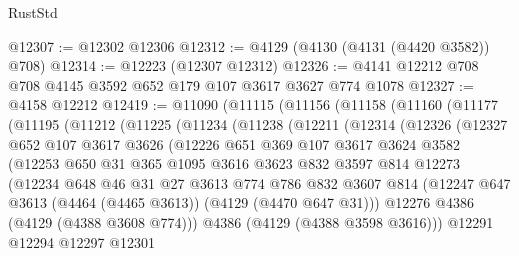 \begin{lexlean}{RustStd}
\begin{coremodule}
{\begin{coremodule}
{{{{{{{{{{{{{{@12307 := @12302 @12306
@12312 := @4129 (@4130 (@4131 (@4420 @3582)) @708)
@12314 := @12223 (@12307 @12312)
@12326 := @4141 @12212 @708 @708 @4145 @3592 @652 @179 @107 @3617 @3627 @774 @1078
@12327 := @4158 @12212
@12419 := @11090
    (@11115
      (@11156
        (@11158
          (@11160
            (@11177
              (@11195
                (@11212
                  (@11225
                    (@11234
                      (@11238
                        (@12211
                          (@12314
                            (@12326
                              (@12327
                                @652
                                @107
                                @3617
                                @3626
                                (@12226
                                  @651
                                  @369
                                  @107
                                  @3617
                                  @3624
                                  @3582
                                  (@12253
                                    @650
                                    @31
                                    @365
                                    @1095
                                    @3616
                                    @3623
                                    @832
                                    @3597
                                    @814
                                    @12273
                                    (@12234
                                      @648
                                      @46
                                      @31
                                      @27
                                      @3613
                                      @774
                                      @786
                                      @832
                                      @3607
                                      @814
                                      (@12247
                                        @647
                                        @3613
                                        (@4464 (@4465 @3613))
                                        (@4129 (@4470 @647 @31)))
                                      @12276
                                      @4386
                                      (@4129 (@4388 @3608 @774)))
                                    @4386
                                    (@4129 (@4388 @3598 @3616)))
                                  @12291
                                  @12294
                                  @12297
                                  @12301
}}}}}}}}}}}}}}
\end{coremodule}}
\end{coremodule}
\end{lexlean}
